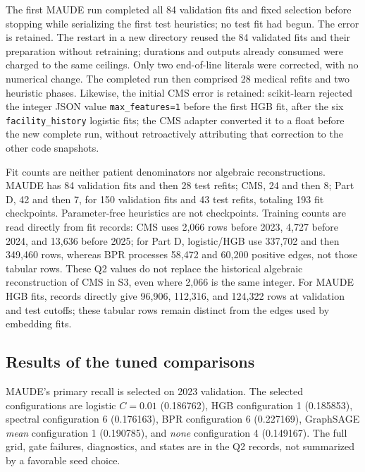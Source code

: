The first MAUDE run completed all 84 validation fits and fixed selection before stopping while serializing the first test heuristics; no test fit had begun. The error is retained. The restart in a new directory reused the 84 validated fits and their preparation without retraining; durations and outputs already consumed were charged to the same ceilings. Only two end-of-line literals were corrected, with no numerical change. The completed run then comprised 28 medical refits and two heuristic phases. Likewise, the initial CMS error is retained: scikit-learn rejected the integer JSON value \texttt{max\_features=1} before the first HGB fit, after the six \texttt{facility\_history} logistic fits; the CMS adapter converted it to a float before the new complete run, without retroactively attributing that correction to the other code snapshots.

Fit counts are neither patient denominators nor algebraic reconstructions. MAUDE has 84 validation fits and then 28 test refits; CMS, 24 and then 8; Part D, 42 and then 7, for 150 validation fits and 43 test refits, totaling 193 fit checkpoints. Parameter-free heuristics are not checkpoints. Training counts are read directly from fit records: CMS uses 2,066 rows before 2023, 4,727 before 2024, and 13,636 before 2025; for Part D, logistic/HGB use 337,702 and then 349,460 rows, whereas BPR processes 58,472 and 60,200 positive edges, not those tabular rows. These Q2 values do not replace the historical algebraic reconstruction of CMS in S3, even where 2,066 is the same integer. For MAUDE HGB fits, records directly give 96,906, 112,316, and 124,322 rows at validation and test cutoffs; these tabular rows remain distinct from the edges used by embedding fits.

\subsection{Results of the tuned comparisons}

\begin{table}[!htbp]\centering\small
\caption{New MAUDE Q2 comparison: micro recall@10 in 2023 validation and annual tests in 2024--2025. Latent models report the mean over seeds 103/211/307, never the best seed. Results remain exploratory.}
\label{tab:q2-maude}

\end{table}

MAUDE's primary recall is selected on 2023 validation. The selected configurations are logistic $C=0.01$ (0.186762), HGB configuration 1 (0.185853), spectral configuration 6 (0.176163), BPR configuration 6 (0.227169), GraphSAGE \emph{mean} configuration 1 (0.190785), and \emph{none} configuration 4 (0.149167). The full grid, gate failures, diagnostics, and states are in the Q2 records, not summarized by a favorable seed choice.

